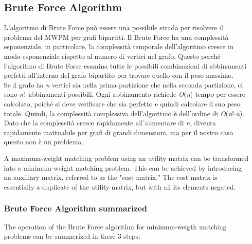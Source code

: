 \begin{figure}[H]
\begin{minipage}{0.5\textwidth}

  \end{minipage}
\end{figure}


\subsection{Brute Force Algorithm}
L'algoritmo di Brute Force può essere una possibile strada per risolvere il problema del MWPM per grafi bipartiti.
Il Brute Force ha una complessità esponenziale, in particolare, la complessità temporale dell'algoritmo cresce in modo esponenziale rispetto al numero di vertici nel grafo.
Questo perché l'algoritmo di Brute Force esamina tutte le possibili combinazioni di abbinamenti perfetti all'interno del grafo bipartito per trovare quello con il peso massimo. \\
Se il grafo ha \textit{n} vertici sia nella prima partizione che nella seconda partizione, ci sono \textit{n}!\ abbinamenti possibili.
Ogni abbinamento richiede \textit{O}(\textit{n}) tempo per essere calcolato, poiché si deve verificare che sia perfetto e quindi calcolare il suo peso totale.
Quindi, la complessità complessiva dell'algoritmo è dell'ordine di \textit{O}(\textit{n}!$\cdot$\textit{n}). \\
Dato che la complessità cresce rapidamente all'aumentare di \textit{n}, diventa rapidamente inattuabile per grafi di grandi dimensioni, ma per il nostro caso questo non è un problema.

A maximum-weight matching problem using an utility matrix can be transformed into a minimum-weight matching problem.
This can be achieved by introducing an auxiliary matrix, referred to as the "cost matrix."
The cost matrix is essentially a duplicate of the utility matrix, but with all its elements negated.

\subsubsection{Brute Force Algorithm summarized}
The operation of the Brute Force algorithm for minimum-weigth matching problems can be summerized in these 3 steps:

